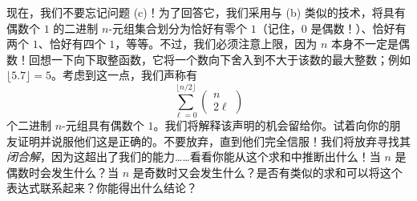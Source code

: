\begin{example}
    现在，我们不要忘记问题 (c)！为了回答它，我们采用与 (b) 类似的技术，将具有偶数个 $1$ 的二进制 $n$-元组集合划分为恰好有零个 $1$（记住，$0$ 是偶数！）、恰好有两个 $1$、恰好有四个 $1$，等等。不过，我们必须注意上限，因为 $n$ 本身不一定是偶数！回想一下向下取整函数，它将一个数向下舍入到不大于该数的最大整数；例如 $\lfloor 5.7 \rfloor = 5$。考虑到这一点，我们声称有
    \[\sum_{\ell=0}^{\lfloor n/2 \rfloor} \begin{pmatrix}
            n \\
            2\ell
        \end{pmatrix}\]
    个二进制 $n$-元组具有偶数个 $1$。我们将解释该声明的机会留给你。试着向你的朋友证明并说服他们这是正确的。不要放弃，直到他们完全信服！我们将放弃寻找其\emph{闭合解}，因为这超出了我们的能力……看看你能从这个求和中推断出什么！当 $n$ 是偶数时会发生什么？当 $n$ 是奇数时又会发生什么？是否有类似的求和可以将这个表达式联系起来？你能得出什么结论？
\end{example}


